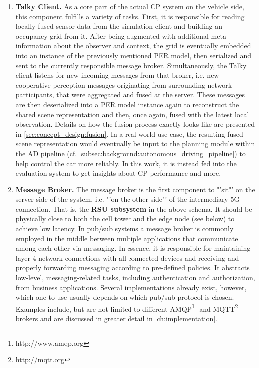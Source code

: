 \begin{enumerate}[C1: ]
	\item \textbf{Talky Client.} As a core part of the actual CP system on the vehicle side, this component fulfills a variety of tasks. First, it is responsible for reading locally fused sensor data from the simulation client and building an occupancy grid from it. After being augmented with additional meta information about the observer and context, the grid is eventually embedded into an instance of the previously mentioned PER model, then serialized and sent to the currently responsible message broker. Simultaneously, the Talky client listens for new incoming messages from that broker, i.e. new cooperative perception messages originating from surrounding network participants, that were aggregated and fused at the server. These messages are then deserialized into a PER model instance again to reconstruct the shared scene representation and then, once again, fused with the latest local observation. Details on how the fusion process exactly looks like are presented in \cref{sec:concept_design:fusion}. In a real-world use case, the resulting fused scene representation would eventually be input to the planning module within the AD pipeline (cf. \cref{subsec:background:autonomous_driving_pipeline}) to help control the car more reliably. In this work, it is instead fed into the evaluation system to get insights about CP performance and more.
	\item \textbf{Message Broker.} The message broker is the first component to "'sit"' on the server-side of the system, i.e. "'on the other side"' of the intermediary 5G connection. That is, the \textbf{RSU subsystem} in the above schema. It should be physically close to both the cell tower and the edge node (see below) to achieve low latency. In pub/sub systems a message broker is commonly employed in the middle between multiple applications that communicate among each other via messaging. In essence, it is responsible for maintaining layer 4 network connections with all connected devices and receiving and properly forwarding messaging according to pre-defined policies. It abstracts low-level, messaging-related tasks, including authentication and authorization, from business applications. Several implementations already exist, however, which one to use usually depends on which pub/sub protocol is chosen. Examples include, but are not limited to different AMQP\footnote{http://www.amqp.org}- and MQTT\footnote{http://mqtt.org} brokers and are discussed in greater detail in \cref{ch:implementation}.

\end{enumerate}
